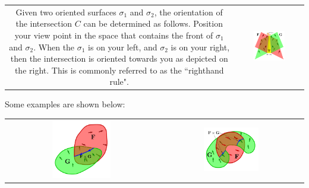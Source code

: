 \documentclass{book}
\begin{document}
\begin{tabular}{cc}
\parbox{0.5\textwidth}{
Given two oriented surfaces \(\sigma_1\) and \(\sigma_2\), the orientation of the intersection \(C\) can be determined as follows. Position your view point in the space that contains the front of \(\sigma_1\) and \(\sigma_2\). When the \(\sigma_1\) is on your left, and \(\sigma_2\) is on your right, then the intersection is oriented towards you as depicted on the right. This is commonly referred to as the ``righthand rule".
} & \parbox{0.5\textwidth}{
\includegraphics[width = 0.5\textwidth]{Intersections/Surface-surface_intersections/right_hand_rule}
}
\end{tabular}

Some examples are shown below:

\begin{center}
\begin{tabular}{cc}
\includegraphics[width = 0.4\textwidth]{Intersections/Surface-surface_intersections/surface_surface_intersections_example}
& 
\includegraphics[width = 0.4\textwidth]{Intersections/Surface-surface_intersections/surface_surface_intersections_example_2}
\end{tabular}
\end{center}
\end{document}
